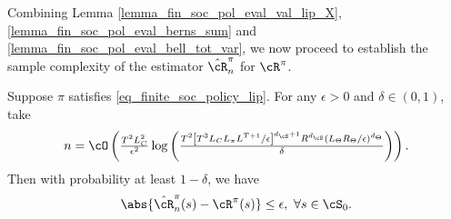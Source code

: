 \documentclass[9pt]{article}
\numberwithin{equation}{section}
\begin{document}
Combining Lemma \ref{lemma_fin_soc_pol_eval_val_lip_X}, \ref{lemma_fin_soc_pol_eval_berns_sum} and \ref{lemma_fin_soc_pol_eval_bell_tot_var}, we now proceed to establish the sample complexity of the estimator $\hat{\cR}_n^\pi$ for $\cR^\pi$.
%
\begin{theorem}\label{thrm_sample_eval_soc_finite}
    Suppose $\pi$ satisfies \eqref{eq_finite_soc_policy_lip}. For any $\epsilon > 0$ and $\delta \in (0,1)$, take
    \begin{align}
         n = \cO\left( \tfrac{T^2 L_C^2}{\epsilon^2} \log \left(\tfrac{T^2\left[T^3 L_C L_\pi L^{T+1}/\epsilon\right]^{d_\cS + 1} R^{d_\cS} (L_\Theta R_\Theta/\epsilon)^{d_\Theta}}{ \delta}\right)\right). \nonumber
    \end{align}
    Then with probability at least $1- \delta$, we have
    \begin{align}
        \abs{\hat \cR_n^\pi(s) - \cR^\pi(s) } \leq \epsilon, ~ \forall s \in \cS_0. \nonumber
    \end{align}
\end{theorem}
%
\end{document}
